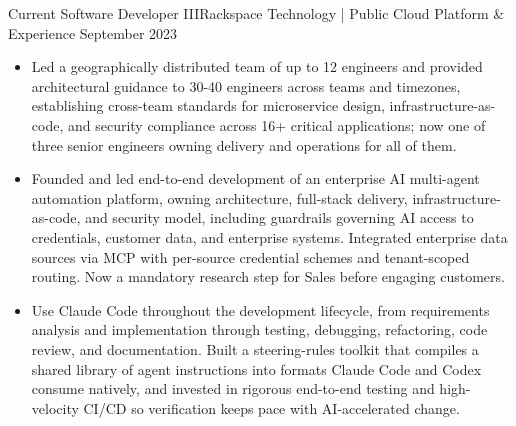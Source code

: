 \begin{experiences}
  \experience
    {Current}       {Software Developer III}{Rackspace Technology | Public Cloud Platform \& Experience}
    {September 2023}{
                      \begin{itemize}
                        \item Led a geographically distributed team of up to
                              12 engineers and provided architectural guidance
                              to 30-40 engineers across teams and timezones,
                              establishing cross-team standards for
                              microservice design, infrastructure-as-code, and
                              security compliance across 16+ critical
                              applications; now one of three senior engineers
                              owning delivery and operations for all of them.
                        \item Founded and led end-to-end development of an
                              enterprise AI multi-agent automation platform,
                              owning architecture, full-stack delivery,
                              infrastructure-as-code, and security model,
                              including guardrails governing AI access to
                              credentials, customer data, and enterprise
                              systems. Integrated enterprise data sources via
                              MCP with per-source credential schemes and
                              tenant-scoped routing. Now a mandatory research
                              step for Sales before engaging customers.
                        \ifresume
                        \item Use Claude Code throughout the development
                              lifecycle, from requirements analysis and
                              implementation through testing, debugging,
                              refactoring, code review, and documentation.
                              Built a steering-rules toolkit that compiles a
                              shared library of agent instructions into formats
                              Claude Code and Codex consume natively, and
                              invested in rigorous end-to-end testing and
                              high-velocity CI/CD so verification keeps pace
                              with AI-accelerated change.
                        \fi
                        \ifcv

\end{itemize}}
\end{experiences}
